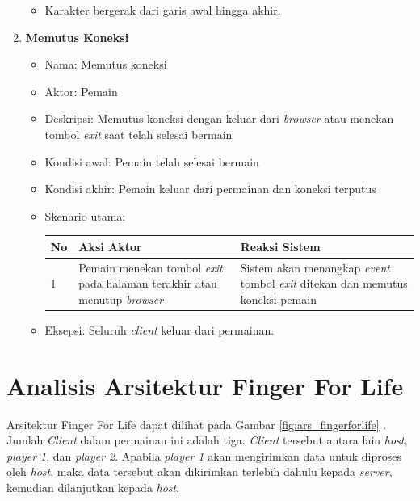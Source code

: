 \begin{enumerate}
\begin{itemize}
			\item Karakter bergerak dari garis awal hingga akhir.	
			
		\end{itemize}
	
	\item \textbf{Memutus Koneksi}
	
		\begin{itemize}
			\item Nama: Memutus koneksi
			
			\item Aktor: Pemain
			
			\item Deskripsi: Memutus koneksi dengan keluar dari \textit{browser} atau menekan tombol \textit{exit} saat telah selesai bermain
			
			\item Kondisi awal: Pemain telah selesai bermain
			
			\item Kondisi akhir: Pemain keluar dari permainan dan koneksi terputus
			
			\item Skenario utama:
			
\begin{tabular}{ |p{1cm}|p{4cm}|p{4cm}|}
	\hline
	No & Aksi Aktor & Reaksi Sistem \\ \hline
	1 & Pemain menekan tombol \textit{exit} pada halaman terakhir atau menutup \textit{browser} & Sistem akan menangkap \textit{event} tombol \textit{exit} ditekan dan memutus koneksi pemain \\ \hline
\end{tabular}
			
			\item Eksepsi: Seluruh \textit{client} keluar dari permainan.
		\end{itemize}
\end{enumerate}


\section{Analisis Arsitektur Finger For Life}
Arsitektur Finger For Life dapat dilihat pada Gambar \ref{fig:ars_fingerforlife} . Jumlah \textit{Client} dalam permainan ini adalah tiga. \textit{Client} tersebut antara lain \textit{host}, \textit{player 1}, dan \textit{player 2}. Apabila \textit{player 1} akan mengirimkan data untuk diproses oleh \textit{host}, maka data tersebut akan dikirimkan terlebih dahulu kepada \textit{server}, kemudian dilanjutkan kepada \textit{host}.

